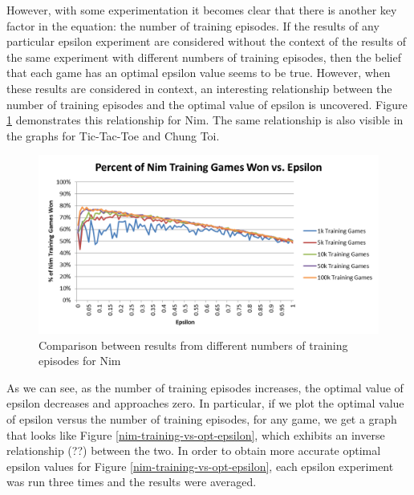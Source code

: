 \documentclass[11pt,a4paper]{report}
\begin{document}
However, with some experimentation it becomes clear that there is another key factor in the equation: the number of training episodes. If the results of any particular epsilon experiment are considered without the context of the results of the same experiment with different numbers of training episodes, then the belief that each game has an optimal epsilon value seems to be true. However, when these results are considered in context, an interesting relationship between the number of training episodes and the optimal value of epsilon is uncovered. Figure \ref{nim-epsilon-win-comparison} demonstrates this relationship for Nim. The same relationship is also visible in the graphs for Tic-Tac-Toe and Chung Toi.

\begin{figure}[htbp]
	\begin{center}
		\includegraphics[width=125mm]{Nim_EpsilonResults_Wins_Comparison.png}
		\caption{Comparison between results from different numbers of training episodes for Nim}
		\label{nim-epsilon-win-comparison}
	\end{center}
\end{figure}

As we can see, as the number of training episodes increases, the optimal value of epsilon decreases and approaches zero. In particular, if we plot the optimal value of epsilon versus the number of training episodes, for any game, we get a graph that looks like Figure \ref{nim-training-vs-opt-epsilon}, which exhibits an inverse relationship (??) between the two. In order to obtain more accurate optimal epsilon values for Figure \ref{nim-training-vs-opt-epsilon}, each epsilon experiment was run three times and the results were averaged.
\end{document}
